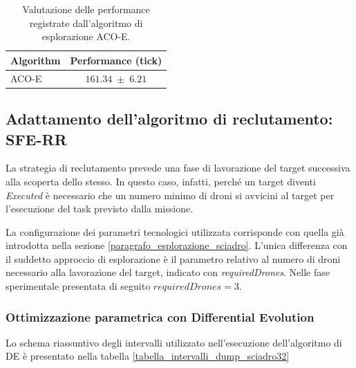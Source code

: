 \begin{table}[H]
    \centering
    \captionsetup{justification=centering, margin=2cm, font=footnotesize}
    \begin{tabular}{|l|c|}
    \hline
    \textbf{Algorithm}              & \textbf{Performance (tick)}              \\ \hline
    ACO-E                & $161.34 \; \pm \; 6.21$           \\ \hline
    \end{tabular}%
    
    \caption{Valutazione delle performance registrate dall'algoritmo di esplorazione ACO-E.}
    \label{tabella_performance_dump_ACO}
\end{table}


\subsection{Adattamento dell'algoritmo di reclutamento: \\SFE-RR}

La strategia di reclutamento prevede una fase di lavorazione del target successiva alla scoperta dello stesso.
In questo caso, infatti, perché un target diventi \textit{Executed} è necessario che un numero minimo di droni si avvicini al target per l'esecuzione del task previsto dalla missione.

La configurazione dei parametri tecnologici utilizzata corrisponde con quella già introdotta nella sezione \ref{paragrafo_esplorazione_sciadro}.
L'unica differenza con il suddetto approccio di esplorazione è il parametro relativo al numero di droni necessario alla lavorazione del target, indicato con \textit{requiredDrones}.
Nelle fase sperimentale presentata di seguito $requiredDrones = 3$.

\subsubsection{Ottimizzazione parametrica con Differential Evolution}

Lo schema riassuntivo degli intervalli utilizzato nell'esecuzione dell'algoritmo di DE è presentato nella tabella \ref{tabella_intervalli_dump_sciadro32}

